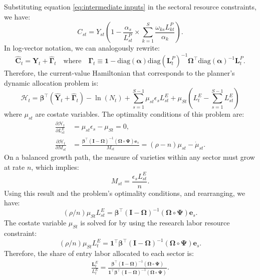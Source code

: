 \documentclass[12pt]{article}
\newcommand{\partialof}[2]{\frac{\partial #1}{\partial #2}}
\begin{document}
Substituting equation \eqref{eq:intermediate inputs} in the sectoral resource constraints, we have:
\begin{equation*}
    C_{st} = Y_{st} \left(1 - \frac{\alpha_s}{L_{st}^P} \times \sum_{k = 1}^S \frac{\omega_{ks} L_{kt}^P}{\alpha_k}\right).
\end{equation*}
In log-vector notation, we can analogously rewrite:
\begin{equation*}
    \hat{\mathbf{C}}_t = \hat{\mathbf{Y}}_t + \hat{\bm{\Gamma}}_t \quad \text{where} \quad \bm{\Gamma}_t \equiv \mathbf{1} - \text{diag}(\bm{\alpha}) \text{diag}(\mathbf{L}_t^P)^{-1} \bm{\Omega}^{\top} \text{diag}(\bm{\alpha})^{-1} \mathbf{L}_t^P.
\end{equation*}
Therefore, the current-value Hamiltonian that corresponds to the planner's dynamic allocation problem is:
\begin{equation*}
    \mathcal{H}_t = \bm{\beta}^{\top} (\hat{\mathbf{Y}}_t + \hat{\bm{\Gamma}}_t) - \ln(N_t) + \sum_{s = 1}^{S - 1} \mu_{st} \epsilon_s L_{st}^E + \mu_{St} \left(L_t^E - \sum_{s = 1}^{S - 1} L_{st}^E\right)
\end{equation*}
where $\mu_{st}$ are costate variables. The optimality conditions of this problem are:
\begin{align*}
    \partialof{\mathcal{H}_t}{L_{st}^E} &= \mu_{st} \epsilon_s - \mu_{St} = 0, \\
    \partialof{\mathcal{H}_t}{M_{st}} &= \frac{\bm{\beta}^{\top} (\mathbf{I} - \bm{\Omega})^{-1} (\bm{\Omega} \circ \bm{\Psi}) \mathbf{e}_s}{M_{st}} = (\rho - n) \mu_{st} - \dot{\mu}_{st}.
\end{align*}
On a balanced growth path, the measure of varieties within any sector must grow at rate $n$, which implies:
\begin{equation*}
    M_{st} = \frac{\epsilon_s L_{st}^E}{n}.
\end{equation*}
Using this result and the problem's optimality conditions, and rearranging, we have:
\begin{equation*}
    (\rho / n) \mu_{St} L_{st}^E = \bm{\beta}^{\top} (\mathbf{I} - \bm{\Omega})^{-1} (\bm{\Omega} \circ \bm{\Psi}) \mathbf{e}_s.
\end{equation*}
The costate variable $\mu_{St}$ is solved for by using the research labor resource constraint:
\begin{equation*}
    (\rho / n) \mu_{St} L_t^E = \mathbf{1}^{\top} \bm{\beta}^{\top} (\mathbf{I} - \bm{\Omega})^{-1} (\bm{\Omega} \circ \bm{\Psi}) \mathbf{e}_s.
\end{equation*}
Therefore, the share of entry labor allocated to each sector is:
\begin{align*}
    \frac{\mathbf{L}_t^E}{L_t^E} = \frac{\bm{\beta}^{\top} (\mathbf{I} - \bm{\Omega})^{-1} (\bm{\Omega} \circ \bm{\Psi})}{\mathbf{1}^{\top} \bm{\beta}^{\top} (\mathbf{I} - \bm{\Omega})^{-1} (\bm{\Omega} \circ \bm{\Psi})}.
\end{align*}
\end{document}
